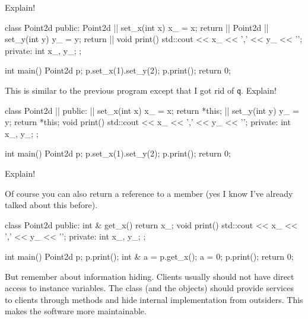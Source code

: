 Explain!

\begin{consolethree}[escapeinside=||]
class Point2d
{
public:
    Point2d |\EMPHASIZE{\&}| set_x(int x)
    {
        x_ = x;
        return ||
    }
    Point2d |\EMPHASIZE{\&}| set_y(int y)
    {
        y_ = y;
        return ||
    }
    void print()
    {
        std::cout << x_ << ',' << y_ << '\n';
    }
private:
    int x_, y_;
};

int main()
{
    Point2d p;
    p.set_x(1).set_y(2);
    p.print();
    return 0;
}
\end{consolethree}

This is similar to the previous program except that I got rid of \texttt{q}. Explain!

\begin{consolethree}[escapeinside=||]
class Point2d ||
{
public:
    || set_x(int x)
    {
        x_ = x;
        return *this;
    }
    || set_y(int y)
    {
        y_ = y;
        return *this;
    }
    void print()
    {
        std::cout << x_ << ',' << y_ << '\n';
    }
private:
    int x_, y_;
};

int main()
{
    Point2d p;
    p.set_x(1).set_y(2);
    p.print();
    return 0;
}
\end{consolethree}
Explain!


\newpage{}

Of course you can also return a reference to a member (yes I know
I've already talked about this before).

\begin{consolethree}[escapeinside=||]
class Point2d
{
public:
    int & get_x()
    {
        return x_;
    }
    void print()
    {
        std::cout << x_ << ',' << y_ << '\n';
    }
private:
    int x_, y_;
};

int main()
{
    Point2d p;
    p.print();
    int & a = p.get_x();
    a = 0;
    p.print();
    return 0;
}
\end{consolethree}

But remember about information hiding. Clients usually should not have
direct access to instance variables. The class (and the objects) should
provide services to clients through methods and hide internal
implementation from outsiders. This makes the software more
maintainable.

